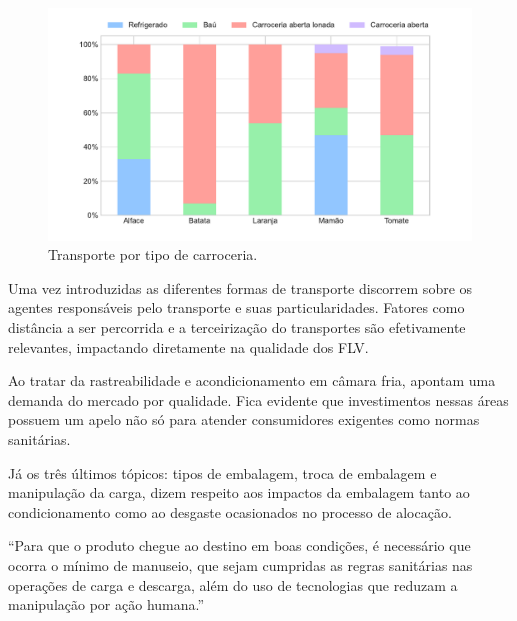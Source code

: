 \begin{figure}
  \caption{Transporte por tipo de carroceria.}
  \begin{center}
      \includegraphics[trim={0 1.2cm 0 0.5cm },scale=0.6]{img/transporte.pdf}
  \end{center}
  \label{fig:transporte}
\end{figure}

Uma vez introduzidas as diferentes formas de transporte  discorrem sobre os agentes responsáveis pelo transporte e suas particularidades. Fatores como distância a ser percorrida e a terceirização do transportes são efetivamente relevantes, impactando diretamente na qualidade dos FLV.

Ao tratar da rastreabilidade e acondicionamento em câmara fria,  apontam uma demanda do mercado por qualidade. Fica evidente que investimentos nessas áreas possuem um apelo não só para atender consumidores exigentes como normas sanitárias.

Já os três últimos tópicos: tipos de embalagem, troca de embalagem e manipulação da carga, dizem respeito aos impactos da embalagem tanto ao condicionamento como ao desgaste ocasionados no processo de alocação.

``Para que o produto chegue ao destino em boas condições, é necessário que ocorra o mínimo de manuseio, que sejam cumpridas as regras sanitárias nas operações de carga e descarga, além do uso de tecnologias que reduzam a manipulação por ação humana.'' \cite[p.~16]{Aliotte2022}





